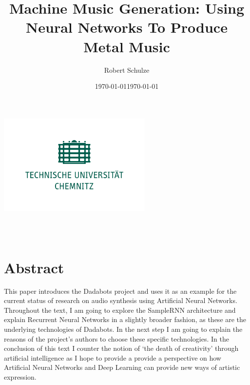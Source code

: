 \documentclass[a4paper, 11pt]{report}
\author{Robert Schulze}
\title{Machine Music Generation: Using Neural Networks To Produce Metal Music}
\date{\today}
\begin{document}
\begin{titlepage}
    \begin{center}
        \includegraphics[height=5cm]{tuc-gruen.png}
        
        \begin{large}
            \thetitle \\
            \theauthor \\
            \date{\today}  
            
        \end{large}
        
    \end{center}
\end{titlepage}

\renewcommand{\thechapter}{\Roman{chapter}}

\setcounter{page}{1} 

\tableofcontents

\chapter*{Abstract}
This paper introduces the Dadabots project and uses it as an example for the 
current status of research on audio synthesis using Artificial Neural 
Networks. Throughout the text, I am going to explore the SampleRNN architecture 
and explain Recurrent Neural Networks in a slightly broader fashion, as these 
are the underlying technologies of Dadabots. In the next step I am going to 
explain the reasons of the project’s authors to choose these specific 
technologies. In the conclusion of this text I counter the notion of ‘the death 
of creativity’ through artificial intelligence as I hope to provide a provide 
a perspective on how Artificial Neural Networks and Deep Learning can 
provide new ways of artistic expression.
\end{document}
